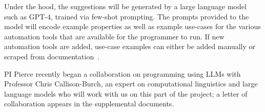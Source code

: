Under the hood, the suggestions will be generated by a large language model
such as GPT-4, trained via few-shot prompting. The prompts provided to the model
will encode example properties as well as example use-cases for the various
automation tools that are available for the programmer to run. If new automation
tools are added, use-case examples can either be added manually or scraped from
documentation~\cite{zhu2023kani}.


PI Pierce recently began a collaboration on programming using LLMs
with Professor Chris Callison-Burch, an expert on computational
linguistics and large language models who will work with us on this
part of the project; a letter of collaboration appears in the
supplemental documents.


